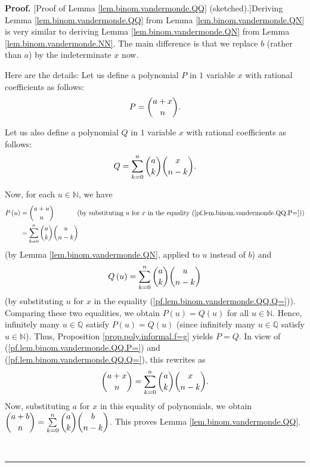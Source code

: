 \documentclass[numbers=enddot,12pt,final,onecolumn,notitlepage]{scrartcl}%
\numberwithin{exer}{subsection}
\theoremstyle{definition}
\newenvironment{fineprint}{\begin{small}}{\end{small}}
\newenvironment{proof}[1][Proof]{\noindent\textbf{#1.} }{\ \rule{0.5em}{0.5em}}
\let\sumnonlimits\sum
\renewcommand{\sum}{\sumnonlimits\limits}
\begin{document}
\begin{proof}
[Proof of Lemma \ref{lem.binom.vandermonde.QQ} (sketched).]Deriving Lemma
\ref{lem.binom.vandermonde.QQ} from Lemma \ref{lem.binom.vandermonde.QN} is
very similar to deriving Lemma \ref{lem.binom.vandermonde.QN} from Lemma
\ref{lem.binom.vandermonde.NN}. The main difference is that we replace $b$
(rather than $a$) by the indeterminate $x$ now.

\begin{fineprint}
Here are the details: Let us define a polynomial $P$ in $1$ variable $x$ with
rational coefficients as follows:%
\begin{equation}
P=\dbinom{a+x}{n}. \label{pf.lem.binom.vandermonde.QQ.P=}%
\end{equation}


Let us also define a polynomial $Q$ in $1$ variable $x$ with rational
coefficients as follows:%
\begin{equation}
Q=\sum_{k=0}^{n}\dbinom{a}{k}\dbinom{x}{n-k}.
\label{pf.lem.binom.vandermonde.QQ.Q=}%
\end{equation}


Now, for each $u\in\mathbb{N}$, we have%
\begin{align*}
P\left(  u\right)   &  =\dbinom{a+u}{n}\ \ \ \ \ \ \ \ \ \ \left(  \text{by
substituting }u\text{ for }x\text{ in the equality
(\ref{pf.lem.binom.vandermonde.QQ.P=})}\right) \\
&  =\sum_{k=0}^{n}\dbinom{a}{k}\dbinom{u}{n-k}%
\end{align*}
(by Lemma \ref{lem.binom.vandermonde.QN}, applied to $u$ instead of $b$) and%
\[
Q\left(  u\right)  =\sum_{k=0}^{n}\dbinom{a}{k}\dbinom{u}{n-k}%
\]
(by substituting $u$ for $x$ in the equality
(\ref{pf.lem.binom.vandermonde.QQ.Q=})). Comparing these two equalities, we
obtain $P\left(  u\right)  =Q\left(  u\right)  $ for all $u\in\mathbb{N}$.
Hence, infinitely many $u\in\mathbb{Q}$ satisfy $P\left(  u\right)  =Q\left(
u\right)  $ (since infinitely many $u\in\mathbb{Q}$ satisfy $u\in\mathbb{N}$).
Thus, Proposition \ref{prop.poly.informal.f=g} yields $P=Q$. In view of
(\ref{pf.lem.binom.vandermonde.QQ.P=}) and
(\ref{pf.lem.binom.vandermonde.QQ.Q=}), this rewrites as%
\[
\dbinom{a+x}{n}=\sum_{k=0}^{n}\dbinom{a}{k}\dbinom{x}{n-k}.
\]
Now, substituting $a$ for $x$ in this equality of polynomials, we obtain
$\dbinom{a+b}{n}=\sum_{k=0}^{n}\dbinom{a}{k}\dbinom{b}{n-k}$. This proves
Lemma \ref{lem.binom.vandermonde.QQ}.
\end{fineprint}
\end{proof}
\end{document}
